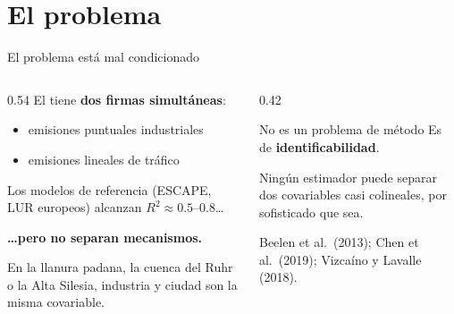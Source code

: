 \documentclass[11pt,aspectratio=169]{beamer}
\begin{document}
\section{El problema}

\begin{frame}{El problema está mal condicionado}
\vspace{-5mm}
\begin{columns}[T]
\begin{column}{0.54\textwidth}
El  tiene \textbf{dos firmas simultáneas}:
\begin{itemize}
  \item emisiones puntuales industriales
  \item emisiones lineales de tráfico
\end{itemize}

\vspace{4mm}
Los modelos de referencia (ESCAPE, LUR europeos) alcanzan
$R^2 \approx \numrange{0.5}{0.8}$\dots

\vspace{2mm}
\textbf{\dots pero no separan mecanismos.}

\vspace{5mm}
{\footnotesize\color{gris}En la llanura padana, la cuenca del Ruhr o la Alta
Silesia, industria y ciudad son la misma covariable.}
\end{column}

\begin{column}{0.42\textwidth}
\vspace{-4mm}
\begin{block}{No es un problema de método}
Es de \textbf{identificabilidad}.

\vspace{2mm}
Ningún estimador puede separar dos covariables casi colineales, por
sofisticado que sea.
\end{block}

\vspace{4mm}
{\footnotesize\color{gris}Beelen et al.\ (2013); Chen et al.\ (2019);
Vizcaíno y Lavalle (2018).}
\end{column}
\end{columns}

\end{frame}
\end{document}
